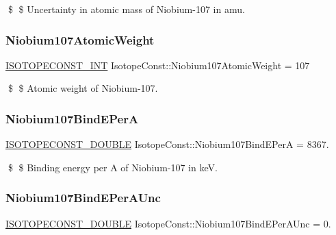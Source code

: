 \$ \$ Uncertainty in atomic mass of Niobium-\/107 in amu. \mbox{\label{group___isotope_const-_niobium-_nb107_gab4e705b18cdb06ec331e7b7a82162861}} 
\subsubsection{\texorpdfstring{Niobium107\+Atomic\+Weight}{Niobium107AtomicWeight}}
{\footnotesize\ttfamily \mbox{\hyperlink{group___isotope_const-_macros_ga5f18360b3e99483a35c32d789e62621c}{I\+S\+O\+T\+O\+P\+E\+C\+O\+N\+S\+T\+\_\+\+I\+NT}} Isotope\+Const\+::\+Niobium107\+Atomic\+Weight = 107}

\$ \$ Atomic weight of Niobium-\/107. \mbox{\label{group___isotope_const-_niobium-_nb107_ga2ce8e73ccb73261336f28d535f3472bf}} 
\subsubsection{\texorpdfstring{Niobium107\+Bind\+E\+PerA}{Niobium107BindEPerA}}
{\footnotesize\ttfamily \mbox{\hyperlink{group___isotope_const-_macros_ga8f45a7272ce02c0b4c65c44636ed719a}{I\+S\+O\+T\+O\+P\+E\+C\+O\+N\+S\+T\+\_\+\+D\+O\+U\+B\+LE}} Isotope\+Const\+::\+Niobium107\+Bind\+E\+PerA = 8367.}

\$ \$ Binding energy per A of Niobium-\/107 in keV. \mbox{\label{group___isotope_const-_niobium-_nb107_gaf4b06074d6b3fd7c370f4e873becc06a}} 
\subsubsection{\texorpdfstring{Niobium107\+Bind\+E\+Per\+A\+Unc}{Niobium107BindEPerAUnc}}
{\footnotesize\ttfamily \mbox{\hyperlink{group___isotope_const-_macros_ga8f45a7272ce02c0b4c65c44636ed719a}{I\+S\+O\+T\+O\+P\+E\+C\+O\+N\+S\+T\+\_\+\+D\+O\+U\+B\+LE}} Isotope\+Const\+::\+Niobium107\+Bind\+E\+Per\+A\+Unc = 0.}

